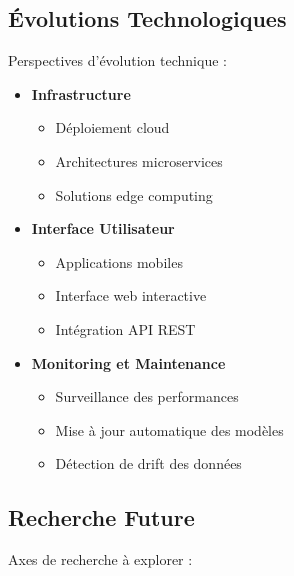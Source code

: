 \subsection{Évolutions Technologiques}
Perspectives d'évolution technique :

\begin{itemize}
    \item \textbf{Infrastructure}
    \begin{itemize}
        \item Déploiement cloud
        \item Architectures microservices
        \item Solutions edge computing
    \end{itemize}

    \item \textbf{Interface Utilisateur}
    \begin{itemize}
        \item Applications mobiles
        \item Interface web interactive
        \item Intégration API REST
    \end{itemize}

    \item \textbf{Monitoring et Maintenance}
    \begin{itemize}
        \item Surveillance des performances
        \item Mise à jour automatique des modèles
        \item Détection de drift des données
    \end{itemize}
\end{itemize}

\subsection{Recherche Future}
Axes de recherche à explorer :

